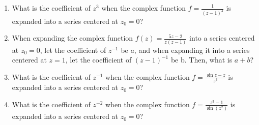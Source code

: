 \documentclass{article}
\newcommand{\inv}[1]{#1^{-1}}
\theoremstyle{definition}
\begin{document}
	\begin{tcolorbox}[colback=white,colframe=white,arc=5pt,title={\color{black}\bf $\bullet$ Series Expansion of a Complex Function I}]
		\begin{enumerate}[(1)]
			\item What is the coefficient of $z^3$ when the complex function $\displaystyle f=\frac{1}{(z-1)^2}$ is expanded into a series centered at $z_0=0$?
			\item When expanding the complex function $\displaystyle f(z)=\frac{5z-2}{z(z-1)}$ into a series centered at $z_0=0$, let the coefficient of $\inv{z}$ be $a$, and when expanding it into a series centered at $z=1$, let the coefficient of $(z-1)^{-1}$ be b. Then, what is $a+b$?
			\item What is the coefficient of $z^{-1}$ when the complex function $\displaystyle f=\frac{\sin z-z}{z^3}$ is expanded into a series centered at $z_0=0$?
			\item What is the coefficient of $z^{-2}$ when the complex function $\displaystyle f=\frac{z^3-1}{\sin(z^2)}$ is expanded into a series centered at $z_0=0$?
		\end{enumerate}
	\end{tcolorbox}
\end{document}
